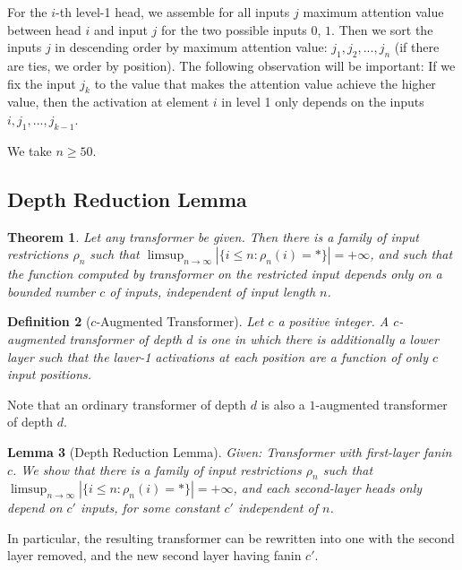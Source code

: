 \documentclass[11pt,a4paper]{article}
\newcounter{theorem}
\newtheorem{defin}[theorem]{Definition}
\newtheorem{lemma}[theorem]{Lemma}
\newtheorem{theorem}[theorem]{Theorem}
\begin{document}
For the $i$-th level-1 head, we assemble for all inputs $j$ maximum attention value between head $i$ and input $j$ for the two possible inputs $0$, $1$.
Then we sort the inputs $j$ in descending order by maximum attention value: $j_1, j_2, ..., j_n$ (if there are ties, we order by position).
The following observation will be important: If we fix the input $j_k$ to the value that makes the attention value achieve the higher value, then the activation at element $i$ in level 1 only depends on the inputs $i, j_1, ..., j_{k-1}$.

We take $n \geq 50$.



\subsection{Depth Reduction Lemma}


\begin{theorem}
Let any transformer be given. Then there is a family of input restrictions $\rho_n$ such that $\limsup_{n\rightarrow\infty} |\{i \leq n: \rho_n(i) = *\}| = +\infty$, and such that the function computed by transformer on the restricted input depends only on a bounded number $c$ of inputs, independent of input length $n$.
\end{theorem}

\begin{defin}[$c$-Augmented Transformer]
Let $c$ a positive integer. A $c$-augmented transformer of depth $d$ is one in which there is additionally a lower layer such that the laver-1 activations at each position are a function of only $c$ input positions.
\end{defin}

Note that an ordinary transformer  of depth $d$ is also a $1$-augmented transformer of depth $d$.


\begin{lemma}[Depth Reduction Lemma]
Given: Transformer with first-layer fanin $c$. We show that there is a family of input restrictions $\rho_n$ such that $\limsup_{n\rightarrow\infty} |\{i \leq n: \rho_n(i) = *\}| = +\infty$, and each second-layer heads only depend on $c'$ inputs, for some constant $c'$ independent of $n$.
\end{lemma}

In particular, the resulting transformer can be rewritten into one with the second layer removed, and the new second layer having fanin $c'$.
\end{document}
